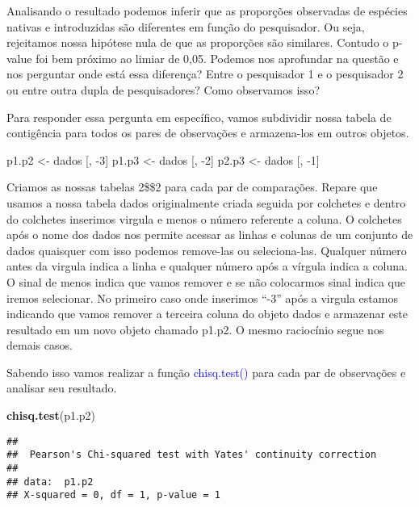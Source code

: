\documentclass[14pt,titlepage, oneside, openany, a4paper]{book}
\newenvironment{Shaded}{\begin{snugshade}}{\end{snugshade}}
\newcommand{\DecValTok}[1]{\textcolor[rgb]{0.00,0.00,0.81}{#1}}
\newcommand{\KeywordTok}[1]{\textcolor[rgb]{0.13,0.29,0.53}{\textbf{#1}}}
\newcommand{\NormalTok}[1]{#1}
\newcommand{\StringTok}[1]{\textcolor[rgb]{0.31,0.60,0.02}{#1}}
\begin{document}
Analisando o resultado podemos inferir que as proporções observadas de espécies nativas e introduzidas são diferentes em função do pesquisador. Ou seja, rejeitamos nossa hipótese nula de que as proporções são similares. Contudo o p-value foi bem próximo ao limiar de 0,05. Podemos nos aprofundar na questão e nos perguntar onde está essa diferença? Entre o pesquisador 1 e o pesquisador 2 ou entre outra dupla de pesquisadores? Como observamos isso?

Para responder essa pergunta em específico, vamos subdividir nossa tabela de contigência para todos os pares de observações e armazena-los em outros objetos.

\begin{Shaded}
\begin{Highlighting}[]
\NormalTok{p1.p2 <-}\StringTok{ }\NormalTok{dados [, }\DecValTok{-3}\NormalTok{]}
\NormalTok{p1.p3 <-}\StringTok{ }\NormalTok{dados [, }\DecValTok{-2}\NormalTok{]}
\NormalTok{p2.p3 <-}\StringTok{ }\NormalTok{dados [, }\DecValTok{-1}\NormalTok{]}
\end{Highlighting}
\end{Shaded}

Criamos as nossas tabelas 2\$\times\$2 para cada par de comparações. Repare que usamos a nossa tabela dados originalmente criada seguida por colchetes e dentro do colchetes inserimos virgula e menos o número referente a coluna. O colchetes após o nome dos dados nos permite acessar as linhas e colunas de um conjunto de dados quaisquer com isso podemos remove-las ou seleciona-las. Qualquer número antes da virgula indica a linha e qualquer número após a vírgula indica a coluna. O sinal de menos indica que vamos remover e se não colocarmos sinal indica que iremos selecionar. No primeiro caso onde inserimos ``-3'' após a virgula estamos indicando que vamos remover a terceira coluna do objeto dados e armazenar este resultado em um novo objeto chamado p1.p2. O mesmo raciocínio segue nos demais casos.

Sabendo isso vamos realizar a função \textcolor{blue}{chisq.test()} para cada par de observações e analisar seu resultado.

\begin{Shaded}
\begin{Highlighting}[]
\KeywordTok{chisq.test}\NormalTok{(p1.p2)}
\end{Highlighting}
\end{Shaded}

\begin{verbatim}
## 
##  Pearson's Chi-squared test with Yates' continuity correction
## 
## data:  p1.p2
## X-squared = 0, df = 1, p-value = 1
\end{verbatim}
\end{document}
